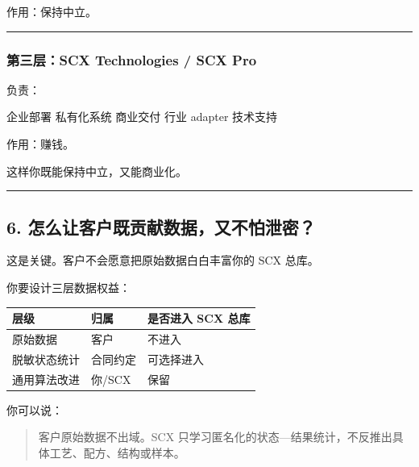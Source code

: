 \documentclass[
  12pt,
]{ctexart}
\newenvironment{Shaded}{}{}
\newcommand{\NormalTok}[1]{#1}
\begin{document}
作用：保持中立。

\begin{center}\rule{0.5\linewidth}{0.5pt}\end{center}

\subsubsection{第三层：SCX Technologies / SCX
Pro}\label{ux7b2cux4e09ux5c42scx-technologies-scx-pro}

负责：

\begin{Shaded}
\begin{Highlighting}[]
\NormalTok{企业部署}
\NormalTok{私有化系统}
\NormalTok{商业交付}
\NormalTok{行业 adapter}
\NormalTok{技术支持}
\end{Highlighting}
\end{Shaded}

作用：赚钱。

这样你既能保持中立，又能商业化。

\begin{center}\rule{0.5\linewidth}{0.5pt}\end{center}

\subsection{6.
怎么让客户既贡献数据，又不怕泄密？}\label{ux600eux4e48ux8ba9ux5ba2ux6237ux65e2ux8d21ux732eux6570ux636eux53c8ux4e0dux6015ux6cc4ux5bc6}

这是关键。客户不会愿意把原始数据白白丰富你的 SCX 总库。

你要设计三层数据权益：

\begin{longtable}[]{@{}lll@{}}
\toprule\noalign{}
层级 & 归属 & 是否进入 SCX 总库 \\
\midrule\noalign{}
\endhead
\bottomrule\noalign{}
\endlastfoot
原始数据 & 客户 & 不进入 \\
脱敏状态统计 & 合同约定 & 可选择进入 \\
通用算法改进 & 你/SCX & 保留 \\
\end{longtable}

你可以说：

\begin{quote}
客户原始数据不出域。SCX
只学习匿名化的状态---结果统计，不反推出具体工艺、配方、结构或样本。
\end{quote}
\end{document}
